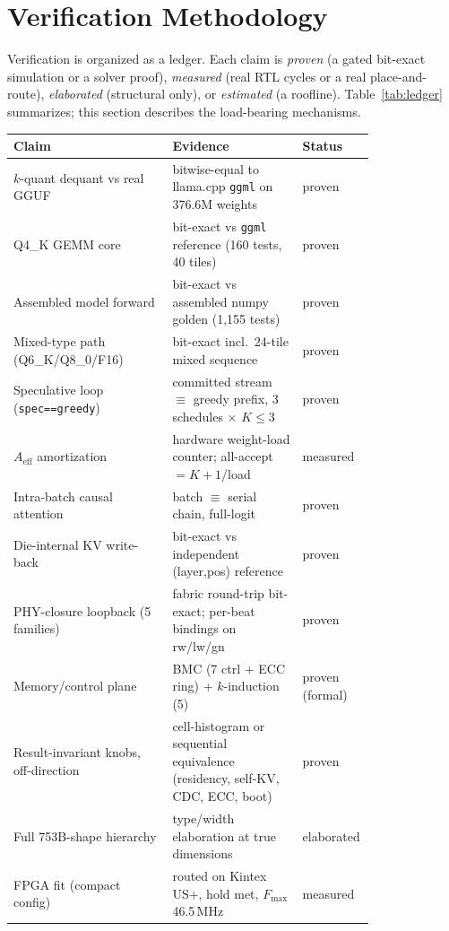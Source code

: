 \documentclass[11pt]{article}
\newcommand{\code}[1]{\texttt{#1}}
\begin{document}
\section{Verification Methodology}
\label{sec:verif}

Verification is organized as a ledger. Each claim is \emph{proven} (a gated
bit-exact simulation or a solver proof), \emph{measured} (real RTL cycles or a
real place-and-route), \emph{elaborated} (structural only), or \emph{estimated}
(a roofline). Table~\ref{tab:ledger} summarizes; this section describes the
load-bearing mechanisms.

\begin{table}[t]
\centering
\small
\begin{tabular}{@{}p{0.44\linewidth}p{0.36\linewidth}l@{}}
\toprule
\textbf{Claim} & \textbf{Evidence} & \textbf{Status} \\
\midrule
$k$-quant dequant vs real GGUF & bitwise-equal to llama.cpp \code{ggml} on 376.6M weights & proven \\
Q4\_K GEMM core & bit-exact vs \code{ggml} reference (160 tests, 40 tiles) & proven \\
Assembled model forward & bit-exact vs assembled numpy golden (1{,}155 tests) & proven \\
Mixed-type path (Q6\_K/Q8\_0/F16) & bit-exact incl.\ 24-tile mixed sequence & proven \\
Speculative loop (\code{spec==greedy}) & committed stream $\equiv$ greedy prefix, 3 schedules $\times$ $K{\le}3$ & proven \\
$A_{\mathrm{eff}}$ amortization & hardware weight-load counter; all-accept $=K{+}1$/load & measured \\
Intra-batch causal attention & batch $\equiv$ serial chain, full-logit & proven \\
Die-internal KV write-back & bit-exact vs independent (layer,pos) reference & proven \\
PHY-closure loopback (5 families) & fabric round-trip bit-exact; per-beat bindings on rw/lw/gn & proven \\
Memory/control plane & BMC (7 ctrl + ECC ring) + $k$-induction (5) & proven (formal) \\
Result-invariant knobs, off-direction & cell-histogram or sequential equivalence (residency, self-KV, CDC, ECC, boot) & proven \\
Full 753B-shape hierarchy & type/width elaboration at true dimensions & elaborated \\
FPGA fit (compact config) & routed on Kintex US+, hold met, $F_{\max}$ 46.5\,MHz & measured \\

\end{tabular}
\end{table}
\end{document}

